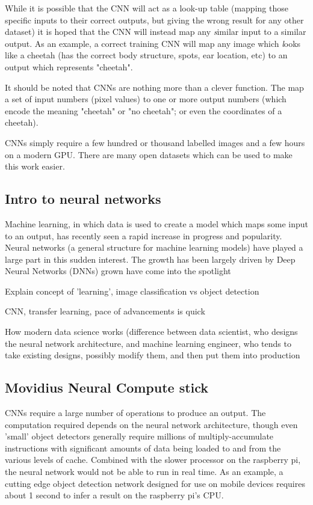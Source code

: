 While it is possible that the CNN will act as a look-up table (mapping those specific inputs to their correct outputs, but giving the wrong result for any other dataset) it is hoped that the CNN will instead map any {\textit similar} input to a similar output. As an example, a correct training CNN will map any image which {\textit looks} like a cheetah (has the correct body structure, spots, ear location, etc) to an output which represents "cheetah".

It should be noted that CNNs are nothing more than a clever function. The map a set of input numbers (pixel values) to one or more output numbers (which encode the meaning "cheetah" or "no cheetah"; or even the coordinates of a cheetah).

CNNs simply require a few hundred or thousand labelled images and a few hours on a modern GPU. There are many open datasets which can be used to make this work easier.

\subsection{Intro to neural networks}
Machine learning, in which data is used to create a model which maps some input to an output, has recently seen a rapid increase in progress and popularity. Neural networks (a general structure for machine learning models) have played a large part in this sudden interest. The growth has been largely driven by Deep Neural Networks (DNNs) grown have come into the spotlight 

Explain concept of 'learning', image classification vs object detection

CNN, transfer learning, pace of advancements is quick

How modern data science works (difference between data scientist, who designs the neural network architecture, and machine learning engineer, who tends to take existing designs, possibly modify them, and then put them into production

\subsection{Movidius Neural Compute stick}
CNNs require a large number of operations to produce an output. The computation required depends on the neural network architecture, though even 'small' object detectors generally require millions of multiply-accumulate instructions with significant amounts of data being loaded to and from the various levels of cache. Combined with the slower processor on the raspberry pi, the neural network would not be able to run in real time. As an example, a cutting edge object detection network designed for use on mobile devices requires about 1 second to infer a result on the raspberry pi's CPU.

